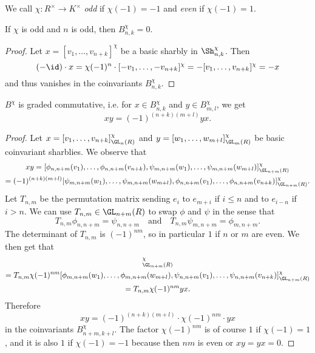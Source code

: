 We call $\chi\colon R^\times \to K^\times$ \emph{odd} if $\chi(-1) = -1$ and \emph{even} if $\chi(-1) =1$.

\begin{lemma}
If $\chi$ is odd and $n$ is odd, then $B^\chi_{n,k} =0$.
\end{lemma}

\begin{proof}
Let $x=[v_1, \dots, v_{n+k}]^\chi$ be a basic sharbly in $\Sh^\chi_{n,k}$. Then
\[ (-\id)\cdot x = \chi(-1)^n \cdot [-v_1, \dots, -v_{n+k}]^\chi = - [v_1, \dots, v_{n+k}]^\chi = -x\]
and thus vanishes in the coinvariants $B^\chi_{n,k}$.
\end{proof}

\begin{lemma}\label{commutative}
$B^\chi$ is graded commutative, i.e. for $x\in B^\chi_{n,k}$ and $y\in B^\chi_{m,l}$, we get
\[ xy = (-1)^{(n+k)(m+l)} yx.\]
\end{lemma}

\begin{proof}
Let $x = [v_1, \dots, v_{n+k}]^\chi_{\GL_n(R)}$ and $y =  [w_1, \dots, w_{m+l}]^\chi_{\GL_m(R)}$ be basic coinvariant sharblies. We observe that
\begin{multline*}xy = [ \phi_{n,n+m}(v_1), \dots, \phi_{n,n+m}(v_{n+k}), \psi_{m,n+m}(w_1), \dots, \psi_{m,n+m}(w_{m+l})]^\chi_{\GL_{n+m}(R)} \\= (-1)^{(n+k)(m+l)} [  \psi_{m,n+m}(w_1), \dots, \psi_{m,n+m}(w_{m+l}),\phi_{n,n+m}(v_1), \dots, \phi_{n,n+m}(v_{n+k})]^\chi_{\GL_{n+m}(R)}. \end{multline*}
Let $T_{n,m}$ be the permutation matrix sending $e_i$ to $e_{m+i}$ if $i\le n$ and to $e_{i-n}$ if $i>n$. We can use $T_{n,m}\in \GL_{n+m}(R)$ to swap $\phi$ and $\psi$ in the sense that 
\[ T_{n,m}\phi_{n,n+m} = \psi_{n,n+m}\quad\text{and}\quad T_{n,m}\psi_{m,n+m} = \phi_{m,n+m}.\]
The determinant of $T_{n,m}$ is $(-1)^{nm}$, so in particular $1$ if $n$ or $m$ are even. We then get that
\begin{multline*} [  \psi_{m,n+m}(w_1), \dots, \psi_{m,n+m}(w_{m+l}),\phi_{n,n+m}(v_1), \dots, \phi_{n,n+m}(v_{n+k})]^\chi_{\GL_{n+m}(R)} \\= T_{n,m} \chi(-1)^{nm}   [  \phi_{m,n+m}(w_1), \dots, \phi_{m,n+m}(w_{m+l}),\psi_{n,n+m}(v_1), \dots, \psi_{n,n+m}(v_{n+k})]^\chi_{\GL_{n+m}(R)} \\=T_{n,m} \chi(-1)^{nm} yx. \end{multline*}
Therefore 
\[ xy = (-1)^{(n+k)(m+l)} \cdot \chi(-1)^{nm} \cdot yx\]
in the coinvariants $B^\chi_{n+m,k+l}$. The factor $\chi(-1)^{nm}$ is of course $1$ if $\chi(-1)=1$, and it is also $1$ if $\chi(-1)=-1$ because then $nm$ is even or $xy=yx=0$.
\end{proof}


